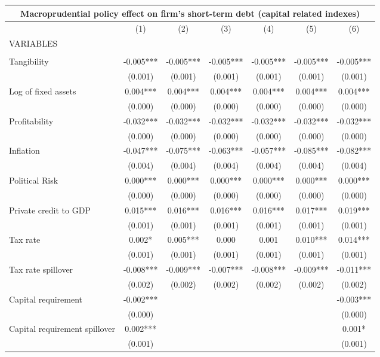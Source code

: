 \begin{tabular}{lcccccc}
\multicolumn{7}{c}{Macroprudential policy effect on firm's short-term debt (capital related indexes)} \\ \hline
 & (1) & (2) & (3) & (4) & (5) & (6) \\
VARIABLES &  &  &  &  &  &  \\ \hline
 &  &  &  &  &  &  \\
Tangibility & -0.005*** & -0.005*** & -0.005*** & -0.005*** & -0.005*** & -0.005*** \\
 & (0.001) & (0.001) & (0.001) & (0.001) & (0.001) & (0.001) \\
Log of fixed assets & 0.004*** & 0.004*** & 0.004*** & 0.004*** & 0.004*** & 0.004*** \\
 & (0.000) & (0.000) & (0.000) & (0.000) & (0.000) & (0.000) \\
Profitability & -0.032*** & -0.032*** & -0.032*** & -0.032*** & -0.032*** & -0.032*** \\
 & (0.000) & (0.000) & (0.000) & (0.000) & (0.000) & (0.000) \\
Inflation & -0.047*** & -0.075*** & -0.063*** & -0.057*** & -0.085*** & -0.082*** \\
 & (0.004) & (0.004) & (0.004) & (0.004) & (0.004) & (0.004) \\
Political Risk & 0.000*** & 0.000*** & 0.000*** & 0.000*** & 0.000*** & 0.000*** \\
 & (0.000) & (0.000) & (0.000) & (0.000) & (0.000) & (0.000) \\
Private credit to GDP & 0.015*** & 0.016*** & 0.016*** & 0.016*** & 0.017*** & 0.019*** \\
 & (0.001) & (0.001) & (0.001) & (0.001) & (0.001) & (0.001) \\
Tax rate & 0.002* & 0.005*** & 0.000 & 0.001 & 0.010*** & 0.014*** \\
 & (0.001) & (0.001) & (0.001) & (0.001) & (0.001) & (0.001) \\
Tax rate spillover & -0.008*** & -0.009*** & -0.007*** & -0.008*** & -0.009*** & -0.011*** \\
 & (0.002) & (0.002) & (0.002) & (0.002) & (0.002) & (0.002) \\
Capital requirement & -0.002*** &  &  &  &  & -0.003*** \\
 & (0.000) &  &  &  &  & (0.000) \\
Capital requirement spillover & 0.002*** &  &  &  &  & 0.001* \\
 & (0.001) &  &  &  &  & (0.001) \\

\end{tabular}
